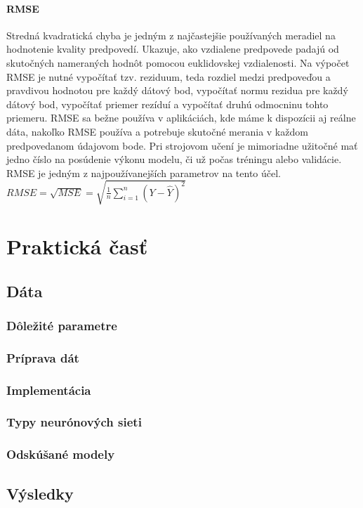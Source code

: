 \paragraph{RMSE} Stredná kvadratická chyba je jedným z najčastejšie používaných meradiel na hodnotenie kvality predpovedí. Ukazuje, ako vzdialene predpovede padajú od skutočných nameraných hodnôt pomocou euklidovskej vzdialenosti. Na výpočet RMSE je nutné vypočítať tzv. reziduum, teda rozdiel medzi predpoveďou a pravdivou hodnotou pre každý dátový bod, vypočítať normu rezidua pre každý dátový bod, vypočítať priemer rezíduí a vypočítať druhú odmocninu tohto priemeru. RMSE sa bežne používa v aplikáciách, kde máme k dispozícii aj reálne dáta, nakoľko RMSE používa a potrebuje skutočné merania v každom predpovedanom údajovom bode. Pri strojovom učení je mimoriadne užitočné mať jedno číslo na posúdenie výkonu modelu, či už počas tréningu alebo validácie. RMSE je jedným z najpoužívanejších parametrov na tento účel. \newline
$RMSE = \sqrt{MSE} = \sqrt{\frac{1}{n}\sum_{i=1}^{n}(Y-\widehat{Y})^{2}}$


\newpage

\section{Praktická časť}

\subsection{Dáta}

\subsubsection{Dôležité parametre}
\subsubsection{Príprava dát}

\subsubsection{Implementácia}
\subsubsection{Typy neurónových sieti}
\subsubsection{Odskúšané modely}

\subsection{Výsledky}